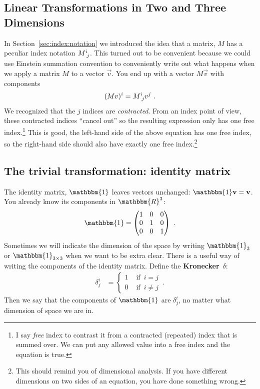 \documentclass[12pt]{article}
\begin{document}
\subsection{Linear Transformations in Two and Three Dimensions}

In Section~\ref{sec:index:notation} we introduced the idea that a matrix, $M$ has a peculiar index notation $M\aij{i}{j}$. This turned out to be convenient because we could use Einstein summation convention to conveniently write out what happens when we apply a matrix $M$ to a vector $\vec{v}$. You end up with a vector $M\vec{v}$ with components
\begin{align}
    (Mv)^i = M\aij{i}{j}v^j \ .
\end{align}
We recognized that the $j$ indices are \emph{contracted}. From an index point of view, these contracted indices ``cancel out'' so the resulting expression  only has one free index.\footnote{I say \emph{free} index to contrast it from a contracted (repeated) index that is summed over. We can put any allowed value into a free index and the equation is true.} This is good, the left-hand side of the above equation has one free index, so the right-hand side should also have exactly one free index.\footnote{This should remind you of dimensional analysis. If you have different dimensions on two sides of an equation, you have done something wrong.}




\subsection{The trivial transformation: identity matrix}

The identity matrix, $\mathbbm{1}$ leaves vectors unchanged: $\mathbbm{1}\vec{v} = \vec{v}$. You already know its components in $\mathbbm{R}^3$:
\begin{align}
    \mathbbm{1} = 
    \begin{pmatrix}
        1 & 0 & 0 \\
        0 & 1 & 0 \\
        0 & 0 & 1
    \end{pmatrix} \ .
\end{align}
Sometimes we will indicate the dimension of the space by writing $\mathbbm{1}_3$ or $\mathbbm{1}_{3\times 3}$ when we want to be extra clear. There is a useful way of writing the components of the identity matrix. Define the \textbf{Kronecker}~$\delta$: 
\begin{align}
    \delta^i_j &= 
    \begin{cases}
    1 & \text{ if }\, i=j\\
    0 & \text{ if }\, i\neq j
    \end{cases} \ .
\end{align}
Then we say that the components of $\mathbbm{1}$ are $\delta^i_j$, no matter what dimension of space we are in.
\end{document}
